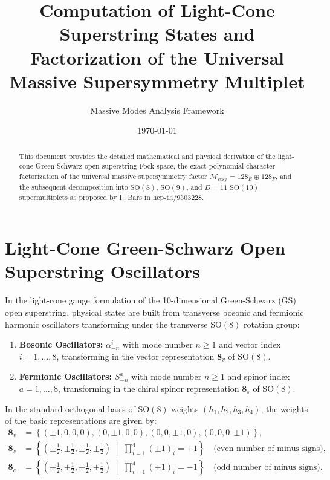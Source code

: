 \documentclass[11pt,a4paper]{article}
\title{\textbf{Computation of Light-Cone Superstring States and Factorization of the Universal Massive Supersymmetry Multiplet}}
\author{Massive Modes Analysis Framework}
\date{\today}
\begin{document}
\maketitle

\begin{abstract}
This document provides the detailed mathematical and physical derivation of the light-cone Green-Schwarz open superstring Fock space, the exact polynomial character factorization of the universal massive supersymmetry factor $\mathcal{M}_{\text{susy}} = 128_B \oplus 128_F$, and the subsequent decomposition into $\mathrm{SO}(8)$, $\mathrm{SO}(9)$, and $D=11$ $\mathrm{SO}(10)$ supermultiplets as proposed by I.~Bars in hep-th/9503228.
\end{abstract}

\section{Light-Cone Green-Schwarz Open Superstring Oscillators}

In the light-cone gauge formulation of the 10-dimensional Green-Schwarz (GS) open superstring, physical states are built from transverse bosonic and fermionic harmonic oscillators transforming under the transverse $\mathrm{SO}(8)$ rotation group:
\begin{enumerate}
    \item \textbf{Bosonic Oscillators:} $\alpha_{-n}^i$ with mode number $n \ge 1$ and vector index $i = 1, \dots, 8$, transforming in the vector representation $\mathbf{8}_v$ of $\mathrm{SO}(8)$.
    \item \textbf{Fermionic Oscillators:} $S_{-n}^a$ with mode number $n \ge 1$ and spinor index $a = 1, \dots, 8$, transforming in the chiral spinor representation $\mathbf{8}_s$ of $\mathrm{SO}(8)$.
\end{enumerate}

In the standard orthogonal basis of $\mathrm{SO}(8)$ weights $(h_1, h_2, h_3, h_4)$, the weights of the basic representations are given by:
\begin{align}
    \mathbf{8}_v &= \left\{ (\pm 1, 0, 0, 0), (0, \pm 1, 0, 0), (0, 0, \pm 1, 0), (0, 0, 0, \pm 1) \right\}, \\
    \mathbf{8}_s &= \left\{ \left(\pm\tfrac{1}{2}, \pm\tfrac{1}{2}, \pm\tfrac{1}{2}, \pm\tfrac{1}{2}\right) \;\middle|\; \prod_{i=1}^4 (\pm 1)_i = +1 \right\} \quad \text{(even number of minus signs)}, \\
    \mathbf{8}_c &= \left\{ \left(\pm\tfrac{1}{2}, \pm\tfrac{1}{2}, \pm\tfrac{1}{2}, \pm\tfrac{1}{2}\right) \;\middle|\; \prod_{i=1}^4 (\pm 1)_i = -1 \right\} \quad \text{(odd number of minus signs)}.
\end{align}
\end{document}
